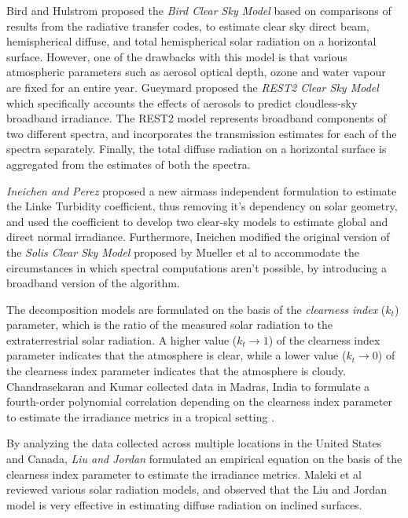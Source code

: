 \par Bird and Hulstrom \cite{litrev_pvlib9} proposed the \textit{Bird Clear Sky Model} based on comparisons of results from the radiative transfer codes, to estimate clear sky direct beam, hemispherical diffuse, and total hemispherical solar radiation on a horizontal surface. However, one of the drawbacks with this model is that various atmospheric parameters such as aerosol optical depth, ozone and water vapour are fixed for an entire year. Gueymard \cite{litrev_pvlib10} proposed the \textit{REST2 Clear Sky Model} which specifically accounts the effects of aerosols to predict cloudless-sky broadband irradiance. The REST2 model represents broadband components of two different spectra, and incorporates the transmission estimates for each of the spectra separately. Finally, the total diffuse radiation on a horizontal surface is aggregated from the estimates of both the spectra.

\par \textit{Ineichen and Perez} \cite{litrev_pvlib14} proposed a new airmass independent formulation to estimate the Linke Turbidity coefficient, thus removing it's dependency on solar geometry, and used the coefficient to develop two clear-sky models to estimate global and direct normal irradiance. Furthermore, Ineichen \cite{litrev_pvlib11} modified the original version of the \textit{Solis Clear Sky Model} proposed by Mueller et al \cite{litrev_pvlib12} to accommodate the circumstances in which spectral computations aren't possible, by introducing a broadband version of the algorithm. 

\par The decomposition models are formulated on the basis of the \textit{clearness index} ($k_t$) parameter, which is the ratio of the measured solar radiation to the extraterrestrial solar radiation. A higher value ($k_t \rightarrow 1$) of the clearness index parameter indicates that the atmosphere is clear, while a lower value ($k_t \rightarrow 0$) of the clearness index parameter indicates that the atmosphere is cloudy. Chandrasekaran and Kumar \cite{litrev_pvlib5} collected data in Madras, India to formulate a fourth-order polynomial correlation depending on the clearness index parameter to estimate the irradiance metrics in a tropical setting \cite{litrev_pvlib6}.

\par By analyzing the data collected across multiple locations in the United States and Canada, \textit{Liu and Jordan} \cite{litrev_pvlib7} formulated an empirical equation on the basis of the clearness index parameter to estimate the irradiance metrics. Maleki et al \cite{litrev_pvlib3} reviewed various solar radiation models, and observed that the Liu and Jordan model is very effective in estimating diffuse radiation on inclined surfaces.

